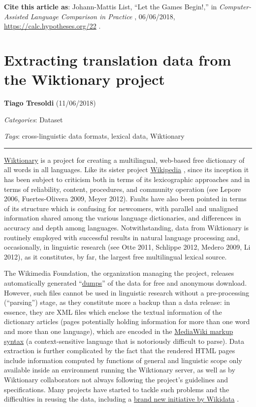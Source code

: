 \documentclass[
  english,
  a4paper,
  oneside,tablecaptionabove
]{scrbook}
\begin{document}
\textbf{Cite this article as}: Johann-Mattis List, ``Let the Games
Begin!,'' in \emph{Computer-Assisted Language Comparison in Practice} ,
06/06/2018, \url{https://calc.hypotheses.org/22} .

\hypertarget{extracting-translation-data-from-the-wiktionary-project}{%
\chapter{Extracting translation data from the Wiktionary
project}\label{extracting-translation-data-from-the-wiktionary-project}}

\textbf{Tiago Tresoldi} (11/06/2018)

\emph{Categories}: Dataset

\emph{Tags}: cross-linguistic data formats, lexical data, Wiktionary

\begin{center}\rule{0.5\linewidth}{\linethickness}\end{center}

\href{https://wiktionary.org}{Wiktionary} is a project for creating a
multilingual, web-based free dictionary of all words in all languages.
Like its sister project \href{https://wikipedia.org}{Wikipedia} , since
its inception it has been subject to criticism both in terms of its
lexicographic approaches and in terms of reliability, content,
procedures, and community operation (see Lepore 2006, Fuertes-Olivera
2009, Meyer 2012). Faults have also been pointed in terms of its
structure which is confusing for newcomers, with parallel and unaligned
information shared among the various language dictionaries, and
differences in accuracy and depth among languages. Notwithstanding, data
from Wiktionary is routinely employed with successful results in natural
language processing and, occasionally, in linguistic research (see Otte
2011, Schlippe 2012, Medero 2009, Li 2012), as it constitutes, by far,
the largest free multilingual lexical source.

The Wikimedia Foundation, the organization managing the project,
releases automatically generated
``\href{https://dumps.wikimedia.org/}{dumps}'' of the data for free and
anonymous download. However, such files cannot be used in linguistic
research without a pre-processing (\enquote{parsing}) stage, as they
constitute more a backup than a data release: in essence, they are XML
files which enclose the textual information of the dictionary articles
(pages potentially holding information for more than one word and more
than one language), which are encoded in the
\href{https://www.mediawiki.org/wiki/Markup_spec}{MediaWiki markup
syntax} (a context-sensitive language that is notoriously difficult to
parse). Data extraction is further complicated by the fact that the
rendered HTML pages include information computed by functions of general
and linguistic scope only available inside an environment running the
Wiktionary server, as well as by Wiktionary collaborators not always
following the project's guidelines and specifications. Many projects
have started to tackle such problems and the difficulties in reusing the
data, including a
\href{https://www.wikidata.org/wiki/Wikidata:Lexicographical_data}{brand
new initiative by Wikidata} .
\end{document}
